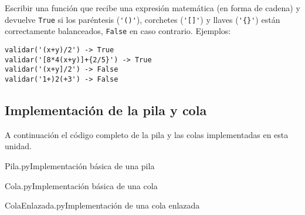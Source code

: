 \begin{ejercicio}
Escribir una función que recibe una expresión matemática (en forma de cadena) y
devuelve \verb|True| si los paréntesis (\verb|'()'|), corchetes
(\verb|'[]'|) y llaves (\verb|'{}'|) están correctamente balanceados,
\verb|False| en caso contrario. Ejemplos:
\begin{lstlisting}[numbers=none]
validar('(x+y)/2') -> True
validar('[8*4(x+y)]+{2/5}') -> True
validar('(x+y]/2') -> False
validar('1+)2(+3') -> False
\end{lstlisting}
\end{ejercicio}

\newpage
\begin{subappendices}
\section{Implementación de la pila y cola}

A continuación el código completo de la pila y las colas implementadas en
esta unidad.

\begin{codigo}{Pila.py}{Implementación básica de una pila}

\end{codigo}

\begin{codigo}{Cola.py}{Implementación básica de una cola}

\end{codigo}

\begin{codigo}{ColaEnlazada.py}{Implementación de una cola enlazada}

\end{codigo}
\end{subappendices}
